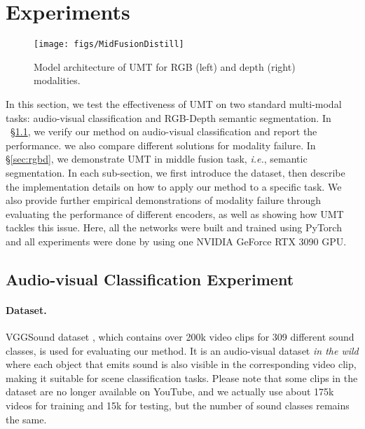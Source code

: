 \section{Experiments}

\begin{figure}[t]
	\centering
	\texttt{[image: figs/MidFusionDistill]}
	\caption{Model architecture of UMT for RGB (left) and depth (right) modalities.}
	\label{fig:mid}
\end{figure}

\label{Sec_4: experimental_results}
In this section, we test the effectiveness of UMT on two standard multi-modal tasks: audio-visual classification and RGB-Depth semantic segmentation. In ~\S\ref{sec:audio_visual}, we verify our method on audio-visual classification and report the performance. we also compare different solutions for modality failure. In \S\ref{sec:rgbd}, we demonstrate UMT in middle fusion task, \textit{i.e.}, semantic segmentation. In each sub-section, we first introduce the dataset, then describe the implementation details on how to apply our method to a specific task. We also provide further empirical demonstrations of modality failure through evaluating the performance of different encoders, as well as showing how UMT tackles this issue. Here, all the networks were built and trained using PyTorch~\cite{paszke2019pytorch} and all experiments were done by using one NVIDIA GeForce RTX 3090 GPU.

\subsection{Audio-visual Classification Experiment}\label{sec:audio_visual}


\paragraph{Dataset.} VGGSound dataset \cite{chen2020vggsound}, which contains over 200k video clips for 309 different sound classes, is used for evaluating our method. It is an audio-visual dataset \textit{in the wild} where each object that emits sound is also visible in the corresponding video clip, making it suitable for scene classification tasks. Please note that some clips in the dataset are no longer available on YouTube, and we actually use about 175k videos for training and 15k for testing, but the number of sound classes remains the same. 

